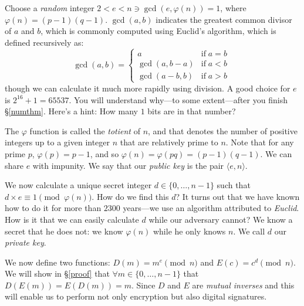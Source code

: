 Choose a \emph{random} integer $2 < e < n \ni \gcd(e, \varphi(n)) = 1$,
where $\varphi(n) = (p-1)(q-1)$. $\gcd(a, b)$ indicates the greatest
common divisor of $a$ and $b$, which is commonly computed using Euclid's
algorithm, which is defined recursively as:
\[
\gcd(a, b) =
\begin{cases}
         a  & \text{if}\; a = b \\
         \gcd(a, b - a)  & \text{if}\; a < b \\
         \gcd(a - b, b) & \text{if}\; a > b \
\end{cases}
\]
though we can calculate it much more rapidly using division. A good
choice for $e$ is $2^{16} + 1 = 65537$. You will understand why---to
some extent---after you finish \S \ref{numthm}.
Here's a hint: How many $1$ bits are in that number?

The $\varphi$ function is called the \emph{totient} of $n$, and that
denotes the number of positive integers up to a given integer $n$ that
are relatively prime to $n$. Note that for any prime $p$, $\varphi(p) =
p - 1$, and so $\varphi(n) = \varphi(p q) = (p-1)(q-1)$. We can share
$e$ with impunity. We say that our \emph{public key} is the pair
$\langle e, n \rangle$.

We now calculate a unique secret integer $d\in \{0, \ldots, n-1\}$ such
that $d \times e \equiv 1 \pmod{\varphi(n)}$. How do we find this $d$?
It turns out that we have known how to do it for more than $2300$
years---we use an algorithm attributed to \emph{Euclid}. How is it that
we can easily calculate $d$ while our adversary cannot? We know a secret
that he does not: we know $\varphi(n)$ while he only knows $n$. We call
$d$ our \emph{private key}.

We now define two functions: $D(m) = m^e \pmod{n}$ and $E(c) = c^d
\pmod{n}$. We will show in \S\ref{proof} that $\forall m \in \{0,
\ldots, n-1\}$ that $D(E(m)) = E(D(m)) = m$. Since $D$ and $E$ are
\emph{mutual inverses} and this will enable us to perform not only
encryption but also digital signatures.
